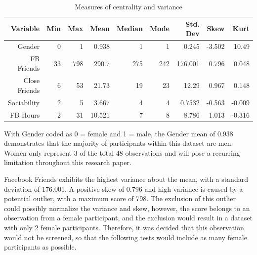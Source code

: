 \begin{table}[H]
\centering
\caption{Measures of centrality and variance}
\begin{tabular}{r|r|r|r|r|r|r|r|r}
Variable      & Min & Max & Mean   & Median & Mode & Std. Dev & Skew   & Kurt    \\ \hline
Gender        & 0   & 1   & 0.938  & 1      & 1    & 0.245    & -3.502 & 10.49   \\ \hline
FB Friends    & 33  & 798 & 290.7  & 275    & 242  & 176.001  & 0.796  & 0.048   \\ \hline
Close Friends & 6   & 53  & 21.73  & 19     & 23   & 12.29    & 0.967  & 0.148   \\ \hline
Sociability   & 2   & 5   & 3.667  & 4      & 4    & 0.7532   & -0.563 & -0.009  \\ \hline
FB Hours      & 2   & 31  & 10.521 & 7      & 8    & 8.786    & 1.013  & -0.316  \\ \hline
\end{tabular}
\end{table}



\newpage
With Gender coded as 0 = female and 1 = male, the Gender mean of 0.938 demonstrates that the majority of participants within this dataset are men. Women only represent 3 of the total 48 observations and will pose a recurring limitation throughout this research paper.


Facebook Friends exhibits the highest variance about the mean, with a standard deviation of 176.001. A positive skew of 0.796 and high variance is caused by a potential outlier, with a maximum score of 798. The exclusion of this outlier could possibly normalize the variance and skew, however, the score belongs to an observation from a female participant, and the exclusion would result in a dataset with only 2 female participants. Therefore, it was decided that this observation would not be screened, so that the following tests would include as many female participants as possible.

